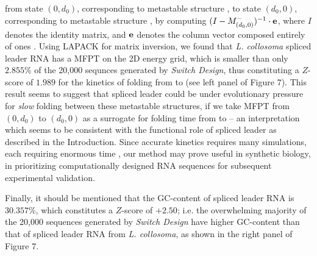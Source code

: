 from state $(0,d_0)$, corresponding to metastable structure \strA,
 to state $(d_0,0)$, corresponding to metastable structure \strB,  by
computing $(I - M^{-}_{(d_0,0)})^{-1} \cdot {\bf e}$, where
$I$ denotes the identity matrix, and ${\bf e}$ denotes the column vector
composed entirely of ones \citep{meyerMFPT}. Using LAPACK \citep{LAPACK}
for matrix inversion, we found that
{\em L. collosoma} spliced leader RNA has a
MFPT on the 2D energy grid, which is smaller than only $2.855\%$ of the
20,000 sequnces generated by {\em Switch Design}, thus constituting a
$Z$-score of $1.989$ for the kinetics of folding from \strA to \strB
(see left panel of Figure 7).
This result seems to suggest that spliced leader could be
under evolutionary pressure for {\em slow} folding between these
metastable structures, if we take
MFPT from $(0,d_0)$ to $(d_0,0)$ as a surrogate for \kinfold \citep{flamm}
folding time from \strA to \strB -- an interpretation which seems to be
consistent with the functional role of spliced leader as described
in the Introduction.
Since accurate \kinfold kinetics requires many simulations,
each requiring enormous time \citep{wolfingerStadler:kinetics},
our method may prove useful in synthetic biology, in prioritizing
computationally designed RNA sequences for subsequent
experimental validation.

Finally, it should be mentioned that the GC-content of spliced leader
RNA is
$30.357\%$, which constitutes a $Z$-score of
$+2.50$; i.e. the overwhelming majority of the 20,000 sequences generated
by {\em Switch Design} have higher GC-content than that of spliced leader
RNA from {\em L. collosoma}, as shown in the right panel of
Figure 7.

